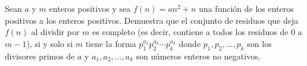 \begin{problem}
    Sean $a$ y $m$ enteros positivos y sea $f(n)=an^2+n$ una funci\'on de los enteros positivos a los enteros positivos. 
    Demuestra que el conjunto de residuos que deja $f(n)$ al dividir por $m$ es completo (es decir, contiene a todos los 
    residuos de $0$ a $m-1$), si y solo si $m$ tiene la forma $p_1^{a_1}p_2^{a_k}\cdots p_k^{a_k}$ donde $p_1, p_2, \ldots,
    p_k$ son los divisores primos de $a$ y $a_1, a_2, \ldots, a_k$ son n\'umeros enteros no negativos.
    

    \label{24MEXIBEROTSTC2}
\end{problem}